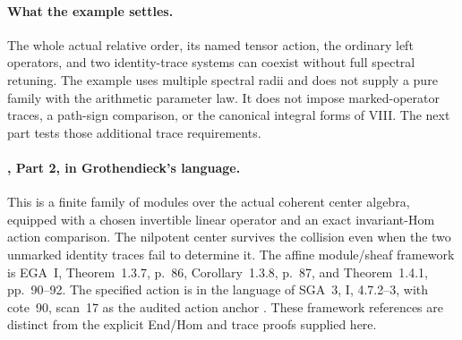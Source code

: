 \paragraph{What the example settles.}
The whole actual relative order, its named tensor action,
the ordinary left operators, and two identity-trace systems
can coexist without full spectral retuning.
The example uses multiple spectral radii and does not
supply a pure family with the arithmetic parameter law.
It does not impose marked-operator traces, a path-sign
comparison, or the canonical integral forms of VIII.
The next part tests those additional trace requirements.

\paragraph{, Part 2, in Grothendieck's language.}
This is a finite family of modules over the actual
coherent center algebra, equipped with a chosen invertible
linear operator and an exact invariant-Hom action comparison.
The nilpotent center survives the collision even when
the two unmarked identity traces fail to determine it.
The affine module/sheaf framework is EGA~I,
Theorem~1.3.7, p.~86, Corollary~1.3.8, p.~87, and
Theorem~1.4.1, pp.~90--92.
The specified action is in the language of SGA~3, I,
4.7.2--3, with cote~90, scan~17 as the audited action
anchor \cite{EGA,SGA3,Archive}.
These framework references are distinct from the
explicit End/Hom and trace proofs supplied here.

